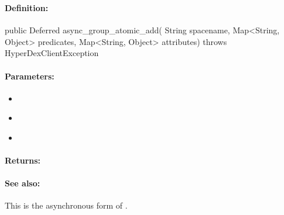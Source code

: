 \pagebreak
\subsubsection{}
\label{api:java:async_group_atomic_add}


\paragraph{Definition:}
\begin{javacode}
public Deferred async_group_atomic_add(
        String spacename,
        Map<String, Object> predicates,
        Map<String, Object> attributes) throws HyperDexClientException
\end{javacode}

\paragraph{Parameters:}
\begin{itemize}[noitemsep]
\item {}\\

\item {}\\

\item {}\\

\end{itemize}

\paragraph{Returns:}


\paragraph{See also:}  This is the asynchronous form of .

\pagebreak
\subsubsection{}
\label{api:java:atomic_sub}


